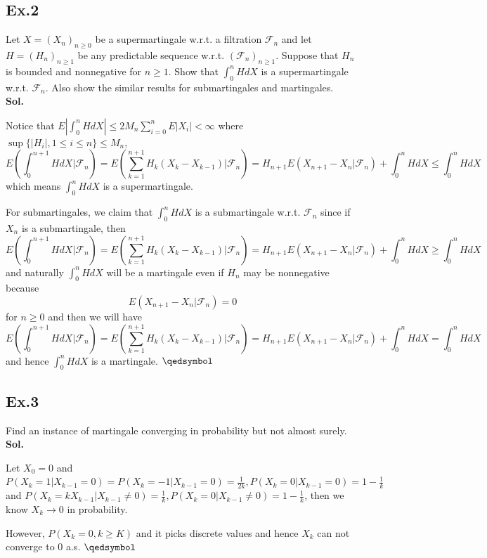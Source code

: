 \documentclass[lang=en,11pt,a4paper,citestyle =authoryear]{elegantpaper}
\newcommand{\prvd}{$\hfill \qedsymbol$}
\newcommand{\F}{\mathcal{F}}
\begin{document}
\subsection*{Ex.2} 
Let $X = (X_n)_{n\geq 0}$ be a supermartingale w.r.t. a filtration $\F_n$ and let $H = (H_n)_{n\geq 1}$ be any predictable sequence w.r.t. $(\F_n)_{n\geq 1}$. Suppose that $H_n$ is bounded and nonnegative for $n\geq 1$. Show that $\int_0^n HdX$ is a supermartingale w.r.t. $\F_n$. Also show the similar results for submartingales and martingales.
\vspace{0.5em}\\
\textbf{Sol.}\par
Notice that $E|\int_0^n HdX| \leq 2M_n\sum\limits_{i=0}^n E|X_i| <\infty$ where $\sup\{|H_i|,1\leq i \leq n\} \leq M_n$,
\[
E(\int_0^{n+1}HdX|\F_n) = E(\sum\limits_{k=1}^{n+1}H_k(X_k-X_{k-1})|\F_n) = H_{n+1}E(X_{n+1}-X_n|\F_n) + \int_0^n HdX \leq \int_0^n HdX
\]
which means $\int_0^n HdX$ is a supermartingale.\par
For submartingales, we claim that $\int_0^n HdX$ is a submartingale w.r.t. $\F_n$ since if $X_n$ is a submartingale, then
\[E(\int_0^{n+1}HdX|\F_n) = E(\sum\limits_{k=1}^{n+1}H_k(X_k-X_{k-1})|\F_n) = H_{n+1}E(X_{n+1}-X_n|\F_n) + \int_0^n HdX \geq \int_0^n HdX\]
and naturally $\int_0^n HdX$ will be a martingale even if $H_n$ may be nonnegative because
\[E(X_{n+1}-X_n|\F_n) = 0\]
for $n\geq 0$ and then we will have
\[
E(\int_0^{n+1}HdX|\F_n) = E(\sum\limits_{k=1}^{n+1}H_k(X_k-X_{k-1})|\F_n) = H_{n+1}E(X_{n+1}-X_n|\F_n) + \int_0^n HdX = \int_0^n HdX
\]
and hence $\int_0^n HdX$ is a martingale.
\prvd
\vspace{0.5em}

\subsection*{Ex.3} 
Find an instance of martingale converging in probability but not almost surely.
\vspace{0.5em}\\
\textbf{Sol.} \par
Let $X_0 = 0$ and $P(X_k = 1|X_{k-1} = 0) = P(X_k = -1|X_{k-1} = 0) = \tfrac{1}{2k}, P(X_k = 0|X_{k-1} = 0) = 1-\tfrac{1}{k}$ and $P(X_k = kX_{k-1}|X_{k-1} \neq 0) = \tfrac{1}{k}, P(X_k = 0|X_{k-1} \neq 0) = 1-\tfrac{1}{k}$, then we know $X_k \to 0$ in probability.\par However, $P(X_k = 0, k\geq K)$ and it picks discrete values and hence $X_k$ can not converge to $0$ a.s. 
\prvd
\vspace{0.5em}
\end{document}
